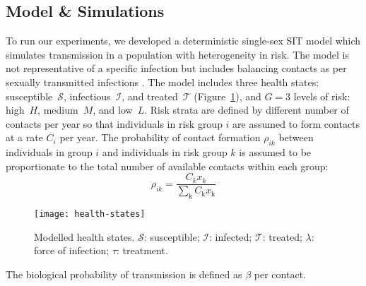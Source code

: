 \subsection{Model \& Simulations}\label{ss:model-sim}
To run our experiments,
we developed a deterministic single-sex SIT model
which simulates transmission in a population with heterogeneity in risk.
The model is not representative of a specific infection
but includes balancing contacts
as per sexually transmitted infections \citep{Garnett1994}.
The model includes three health states:
susceptible~$\mathcal{S}$, infectious~$\mathcal{I}$, and treated~$\mathcal{T}$
(Figure~\ref{fig:health-states}),
and $G = 3$ levels of risk:
high~$H$, medium~$M$, and low~$L$.
Risk strata are defined by different number of contacts per year
so that individuals in risk group $i$ are assumed to
form contacts at a rate $C_{i}$ per year.
The probability of contact formation $\rho_{ik}$ between individuals in group $i$
and individuals in risk group $k$ is assumed to be
proportionate to the total number of available contacts within each group:
\begin{equation}
  \rho_{ik} = \frac
    {C_k x_k}
    {\sum_{\mathrm{k}}C_{\mathrm{k}} x_{\mathrm{k}}}
    \label{eq:rho}
\end{equation}
\begin{figure}
  \centering
  \texttt{[image: health-states]}
  \caption{Modelled health states.
  $\mathcal{S}$: susceptible;
  $\mathcal{I}$: infected;
  $\mathcal{T}$: treated;
  $\lambda$: force of infection;
  $\tau$: treatment.}
  \label{fig:health-states}
\end{figure}
\par
The biological probability of transmission is defined as $\beta$ per contact.
